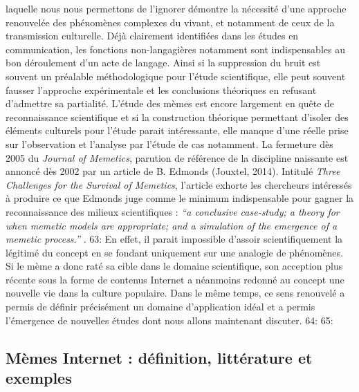 laquelle nous nous permettons de l{\textquoteright}ignorer d\'emontre la n\'ecessit\'e d{\textquoteright}une approche renouvel\'ee des ph\'enom\`enes complexes du vivant, et notamment de ceux de la transmission culturelle. D\'ej\`a clairement identifi\'ees dans les \'etudes en communication, les fonctions non-langagi\`eres notamment sont indispensables au bon d\'eroulement d{\textquoteright}un acte de langage. Ainsi si la suppression du bruit est souvent un pr\'ealable m\'ethodologique pour l{\textquoteright}\'etude scientifique, elle peut souvent fausser l{\textquoteright}approche exp\'erimentale et les conclusions th\'eoriques en refusant d{\textquoteright}admettre sa partialit\'e. L{\textquoteright}\'etude des m\`emes est encore largement en qu\^ete de reconnaissance scientifique et si la construction th\'eorique permettant d{\textquoteright}isoler des \'el\'ements culturels pour l{\textquoteright}\'etude parait int\'eressante, elle manque d{\textquoteright}une r\'eelle prise sur l{\textquoteright}observation et l{\textquoteright}analyse par l{\textquoteright}\'etude de cas notamment. La fermeture d\`es 2005 du \textit{Journal of Memetics}, parution de r\'ef\'erence de la discipline naissante est annonc\'e d\`es 2002 par un article de B. Edmonds (Jouxtel, 2014). Intitul\'e \textit{Three Challenges for the Survival of Memetics}, l{\textquoteright}article\textit{ }exhorte les chercheurs int\'eress\'es \`a produire ce que Edmonds juge comme le minimum indispensable pour gagner la reconnaissance des milieux scientifiques : \textit{{\textquotedblleft}a conclusive case-study; a theory for when memetic models are appropriate; and a simulation of the emergence of a memetic process.{\textquotedblright}} \cite{Edmonds2002}.  
63: En effet, il parait impossible d{\textquoteright}assoir scientifiquement la l\'egitim\'e du concept en se fondant uniquement sur une analogie de ph\'enom\`enes. Si le m\`eme a donc rat\'e sa cible dans le domaine scientifique, son acception plus r\'ecente sous la forme de contenus Internet a n\'eanmoins redonn\'e au concept une nouvelle vie dans la culture populaire. Dans le m\^eme temps, ce sens renouvel\'e a permis de d\'efinir pr\'ecis\'ement un domaine d{\textquoteright}application id\'eal et a permis l{\textquoteright}\'emergence de nouvelles \'etudes dont nous allons maintenant discuter. 
64: 
65: \subsection[ M\`emes Internet : d\'efinition, litt\'erature et exemples]{M\`emes Internet : d\'efinition, litt\'erature et exemples}

